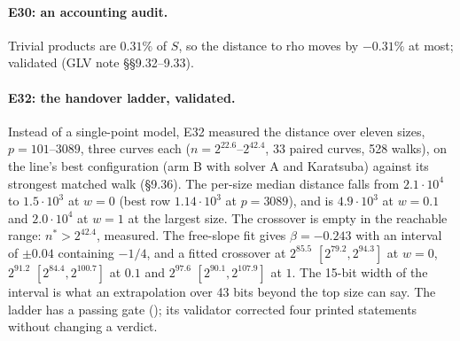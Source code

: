 \paragraph{E30: an accounting audit.} Trivial products are $0.31\%$ of $S$, so
the distance to rho moves by $-0.31\%$ at most; validated (GLV note \S\S9.32--9.33).

\paragraph{E32: the handover ladder, validated.} Instead of a single-point
model, E32 measured the distance over eleven sizes, $p=101$--$3089$, three
curves each ($n=2^{22.6}$--$2^{42.4}$, 33 paired curves, 528 walks), on the line's
best configuration (arm B with solver A and Karatsuba) against its strongest
matched walk (\S9.36). The per-size median distance falls from $2.1\cdot10^4$ to
$1.5\cdot10^3$ at $w=0$ (best row $1.14\cdot10^3$ at $p=3089$), and is $4.9\cdot10^3$ at
$w=0.1$ and $2.0\cdot10^4$ at $w=1$ at the largest size. The crossover is empty in
the reachable range: $n^*>2^{42.4}$, measured. The free-slope fit gives
$\beta=-0.243$ with an interval of $\pm0.04$ containing $-1/4$, and a fitted
crossover at $2^{85.5}$ $[2^{79.2},2^{94.3}]$ at $w=0$, $2^{91.2}$
$[2^{84.4},2^{100.7}]$ at $0.1$ and $2^{97.6}$ $[2^{90.1},2^{107.9}]$ at $1$. The
15-bit width of the interval is what an extrapolation over 43 bits beyond the
top size can say. The ladder has a passing gate
(); its validator corrected four
printed statements without changing a verdict.

